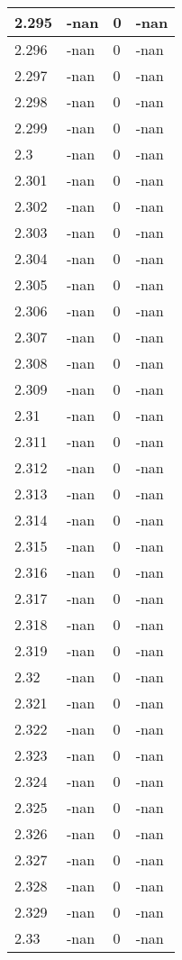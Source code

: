 \documentclass[a4paper,14pt]{extarticle}
\begin{document}
\begin{longtable}{||m{3cm}||m{3cm}|m{3cm}||m{3cm}||}
\hline
2.295 & -nan & 0 & -nan\\
\hline
2.296 & -nan & 0 & -nan\\
\hline
2.297 & -nan & 0 & -nan\\
\hline
2.298 & -nan & 0 & -nan\\
\hline
2.299 & -nan & 0 & -nan\\
\hline
2.3 & -nan & 0 & -nan\\
\hline
2.301 & -nan & 0 & -nan\\
\hline
2.302 & -nan & 0 & -nan\\
\hline
2.303 & -nan & 0 & -nan\\
\hline
2.304 & -nan & 0 & -nan\\
\hline
2.305 & -nan & 0 & -nan\\
\hline
2.306 & -nan & 0 & -nan\\
\hline
2.307 & -nan & 0 & -nan\\
\hline
2.308 & -nan & 0 & -nan\\
\hline
2.309 & -nan & 0 & -nan\\
\hline
2.31 & -nan & 0 & -nan\\
\hline
2.311 & -nan & 0 & -nan\\
\hline
2.312 & -nan & 0 & -nan\\
\hline
2.313 & -nan & 0 & -nan\\
\hline
2.314 & -nan & 0 & -nan\\
\hline
2.315 & -nan & 0 & -nan\\
\hline
2.316 & -nan & 0 & -nan\\
\hline
2.317 & -nan & 0 & -nan\\
\hline
2.318 & -nan & 0 & -nan\\
\hline
2.319 & -nan & 0 & -nan\\
\hline
2.32 & -nan & 0 & -nan\\
\hline
2.321 & -nan & 0 & -nan\\
\hline
2.322 & -nan & 0 & -nan\\
\hline
2.323 & -nan & 0 & -nan\\
\hline
2.324 & -nan & 0 & -nan\\
\hline
2.325 & -nan & 0 & -nan\\
\hline
2.326 & -nan & 0 & -nan\\
\hline
2.327 & -nan & 0 & -nan\\
\hline
2.328 & -nan & 0 & -nan\\
\hline
2.329 & -nan & 0 & -nan\\
\hline
2.33 & -nan & 0 & -nan\\

\end{longtable}
\end{document}
